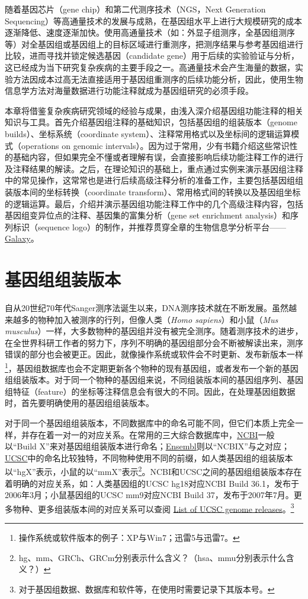 \documentclass[11pt,a4paper,twoside]{book}
\begin{document}
随着基因芯片（gene chip）和第二代测序技术（NGS，Next Generation Sequencing）等高通量技术的发展与成熟，在基因组水平上进行大规模研究的成本逐渐降低、速度逐渐加快。使用高通量技术（如：外显子组测序，全基因组测序等）对全基因组或基因组上的目标区域进行重测序，把测序结果与参考基因组进行比较，进而寻找并锁定候选基因（candidate gene）用于后续的实验验证与分析，这已经成为当下研究复杂疾病的主要手段之一。高通量技术会产生海量的数据，实验方法因成本过高无法直接适用于基因组重测序的后续功能分析，因此，使用生物信息学方法对海量数据进行功能注释就成为基因组研究的必须手段。

本章将借鉴复杂疾病研究领域的经验与成果，由浅入深介绍基因组功能注释的相关知识与工具。首先介绍基因组注释的基础知识，包括基因组的组装版本（genome builds）、坐标系统（coordinate system）、注释常用格式以及坐标间的逻辑运算模式（operations on genomic intervals）。因为过于常用，少有书籍介绍这些常识性的基础内容，但如果完全不懂或者理解有误，会直接影响后续功能注释工作的进行及注释结果的解读。之后，在理论知识的基础上，重点通过实例来演示基因组注释中的常见操作，这常常也是进行后续高级注释分析的准备工作，主要包括基因组组装版本间的坐标转换（coordinate transform）、常用格式间的转换以及基因组坐标的逻辑运算。最后，介绍并演示基因组功能注释工作中的几个高级注释内容，包括基因组变异位点的注释、基因集的富集分析（gene set enrichment analysis）和序列标识（sequence logo）的制作，并推荐贯穿全章的生物信息学分析平台—— \href{http://galaxyproject.org}{Galaxy}。

\section{基因组组装版本}
自从20世纪70年代Sanger测序法诞生以来，DNA测序技术就在不断发展。虽然越来越多的物种加入被测序的行列，但像人类（\textit{Homo sapiens}）和小鼠（\textit{Mus musculus}）一样，大多数物种的基因组并没有被完全测序。随着测序技术的进步，在全世界科研工作者的努力下，序列不明确的基因组部分会不断被解读出来，测序错误的部分也会被更正。因此，就像操作系统或软件会不时更新、发布新版本一样\footnote{操作系统或软件版本的例子：XP与Win7；迅雷5与迅雷7。}，基因组数据库也会不定期更新各个物种的现有基因组，或者发布一个新的基因组组装版本。对于同一个物种的基因组来说，不同组装版本间的基因组序列、基因组特征（feature）的坐标等注释信息会有很大的不同。因此，在处理基因组数据时，首先要明确使用的基因组组装版本。

对于同一个基因组组装版本，不同数据库中的命名可能不同，但它们本质上完全一样，并存在着一对一的对应关系。在常用的三大综合数据库中，\href{http://www.ncbi.nlm.nih.gov}{NCBI}一般以“Build X”来对基因组组装版本进行命名；\href{http://www.ensembl.org/index.html}{Ensembl}则以“NCBIX”与之对应；\href{http://genome.ucsc.edu}{UCSC}中的命名比较独特，不同物种使用不同的前缀，如人类基因组的组装版本以“hgX”表示，小鼠的以“mmX”表示\footnote{hg、mm、GRCh、GRCm分别表示什么含义？（hsa、mmu分别表示什么含义？）}。NCBI和UCSC之间的基因组组装版本存在着明确的对应关系，如：人类基因组的UCSC hg18对应NCBI Build 36.1，发布于2006年3月；小鼠基因组的UCSC mm9对应NCBI Build 37，发布于2007年7月。更多物种、更多组装版本间的对应关系可以查阅 \href{http://genome.ucsc.edu/FAQ/FAQreleases.html\#release1}{List of UCSC genome releases}。\footnote{对于基因组数据、数据库和软件等，在使用时需要记录下其版本号。}
\end{document}
